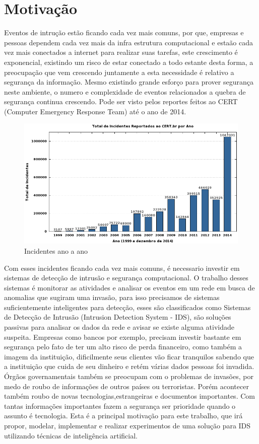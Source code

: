 \documentclass[
	12pt,				%
	openright,			%
	oneside,
	a4paper,			%
	english,			%
	french,				%
	spanish,			%
	brazil				%
	]{abntex2}
\begin{document}
\section{Motivação}

Eventos de intrução estão ficando cada vez mais comuns, por que,
empresas e pessoas dependem cada vez mais da infra estrutura computacional e estaão cada vez mais conectados a internet para realizar suas tarefas, este crescimento é exponencial, existindo um risco de estar conectado a todo estante desta forma, 
a preocupação que vem crescendo juntamente a esta necessidade é relativo a segurança da informação.
Mesmo existindo grande esforço para prover segurança neste ambiente, o numero e complexidade de eventos relacionados a quebra de segurança continua crescendo. Pode ser visto pelos reportes feitos ao CERT (Computer Emergency Response Team) até o ano de 2014.
\begin{figure}[!htb]
     \centering
     \includegraphics[scale=0.5]{Imagens/IntroGraf.png}
     \caption{Incidentes ano a ano}
\end{figure}

Com esses incidentes ficando cada vez mais comuns, é necessario investir em sistemas de detecção de intrusão e segurança computacional.
O trabalho desses sistemas é monitorar as atividades e analisar os eventos em um rede em busca de anomalias que sugiram uma invasão, para isso precisamos de sistemas suficientemente inteligentes para detecção, esses são classificados como Sistemas de Detecção de Intrusão (Intrusion Detection System
- IDS), são soluções passivas para analisar os dados da rede e avisar se existe alguma atividade suspeita.
Empresas como bancos por exemplo, precisam investir bastante em segurança pelo fato de ter um alto risco de perda financeiro, como também a imagem da instituição, dificilmente seus clientes vão ficar tranquilos sabendo que a instituição que cuida de seu dinheiro e retém várias dados pessoas foi invadida.
Órgãos governamentais também se preocupam com o problemas de invasões, por medo de roubo de informações de outros países ou terroristas.
Porém acontecer também roubo de novas tecnologias,estrangeiras e documentos importantes. Com tantas informações importantes fazem a segurança ser prioridade quando o assunto é tecnologia.
Esta é a principal motivação para este trabalho, que irá propor, modelar, implementar e realizar experimentos de uma solução para IDS utilizando técnicas de inteligência artificial.
\end{document}
